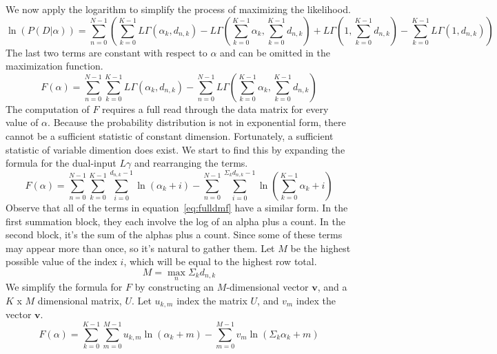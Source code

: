 \documentclass[twoside]{article}
\begin{document}
We now apply the logarithm to simplify the process of maximizing the likelihood.
\begin{equation}
\ln(P(D|\alpha))= \sum_{n=0}^{N-1}\left(\sum_{k=0}^{K-1}L\Gamma(\alpha_k,d_{n,k}) -L\Gamma\left(\sum_{k=0}^{K-1}\alpha_k,\sum_{k=0}^{K-1}d_{n,k}\right)+ L\Gamma\left(1,\sum_{k=0}^{K-1}d_{n,k}\right)-\sum_{k=0}^{K-1}L\Gamma(1,d_{n,k})\right)
\end{equation}
The last two terms are constant with respect to $\alpha$ and can be omitted in the maximization function.
\begin{equation} \label{eq:original_dmf}
F(\alpha)=\sum_{n=0}^{N-1}\sum_{k=0}^{K-1}L\Gamma(\alpha_k,d_{n,k})-
\sum_{n=0}^{N-1}L\Gamma\left(\sum_{k=0}^{K-1}\alpha_k,\sum_{k=0}^{K-1}d_{n,k}\right)
\end{equation}
The computation of $F$ requires a full read through the data matrix for every value of \(\alpha\). Because the probability distribution is not in exponential form, there cannot be a sufficient statistic of constant dimension\cite[pg 116]{robert}. Fortunately, a sufficient statistic of variable dimention does exist. We start to find this by expanding the formula for the dual-input \(L\gamma\) and rearranging the terms.
\begin{equation} \label{eq:fulldmf}
F(\alpha)= \sum_{n=0}^{N-1}\sum_{k=0}^{K-1}\sum_{i=0}^{d_{n,k}-1}\ln\left(\alpha_k+i\right)-
\sum_{n=0}^{N-1}\sum_{i=0}^{\Sigma_kd_{n,k}-1}\ln\left(\sum_{k=0}^{K-1}\alpha_k+i\right)
\end{equation}
Observe that all of the terms in equation~\eqref{eq:fulldmf} have a similar form.  In the first summation block, they each involve the log of an alpha plus a count.  In the second block, it’s the sum of the alphas plus a count. Since some of these terms may appear more than once, so it’s natural to gather them.  Let $M$ be the highest possible value of the index $i$, which will be equal to the highest row total.
\[M = \max_n\Sigma_kd_{n,k}\]
We simplify the formula for $F$ by constructing an $M$-dimensional vector $\mathbf{v}$, and a $K$ x $M$ dimensional matrix, $U$.  Let $u_{k,m}$ index the matrix $U$, and $v_m$ index the vector $\mathbf{v}$.
\begin{equation} \label{eq:finaldmf}
F(\alpha)=\sum_{k=0}^{K-1}\sum_{m=0}^{M-1}u_{k,m}\ln(\alpha_k+m)-
\sum_{m=0}^{M-1}v_m\ln(\Sigma_k\alpha_k+m)
\end{equation}
\end{document}
